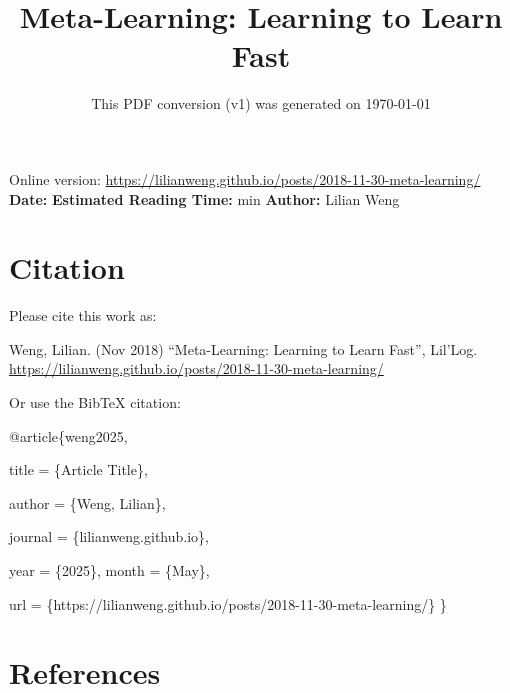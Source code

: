 \documentclass[12pt]{article}
\title{Meta-Learning: Learning to Learn Fast}
\date{This PDF conversion (v1) was generated on \today\footnotemark}
\begin{document}
\maketitle
\begin{center}
    Online version: \url{https://lilianweng.github.io/posts/2018-11-30-meta-learning/} \\
    \textbf{Date:} \quad
    \textbf{Estimated Reading Time:}  min \quad
    \textbf{Author:} Lilian Weng
\end{center}




\newpage
\tableofcontents
\newpage
\vspace{1em}
\n\n\n\section{Citation}
Please cite this work as:

\begin{tcolorbox}[colback=black!5!white, colframe=black!80!white, boxrule=0.5pt, arc=2mm, left=1mm, right=1mm, top=1mm, bottom=1mm]
  Weng, Lilian. (Nov 2018) ``Meta-Learning: Learning to Learn Fast'', Lil'Log. \url{https://lilianweng.github.io/posts/2018-11-30-meta-learning/}
  \end{tcolorbox}

Or use the BibTeX citation:

\begin{tcolorbox}[
    colback=black!5!white,
    colframe=black!80!white,
    boxrule=0.5pt,
    arc=2mm,
    left=1mm,
    right=1mm,
    top=1mm,
    bottom=1mm,
    listing only,
    listing options={
      basicstyle=\ttfamily\footnotesize,
      breaklines=true,
      literate={\{}{{\char`\{}}1 {\}}{{\char`\}}}1
    }
  ]
  @article\{weng2025,

    title   = \{Article Title\},

    author  = \{Weng, Lilian\},

    journal = \{lilianweng.github.io\},

    year    = \{2025\},
    month   = \{May\},

    url     = \{https://lilianweng.github.io/posts/2018-11-30-meta-learning/\}\n
  \}
  \end{tcolorbox}

\newpage
\section{References}

\n
\end{document}
